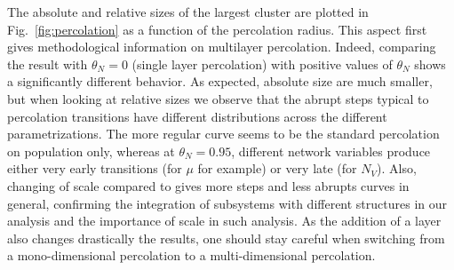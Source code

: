 \documentclass{jimis-en}
\begin{document}
The absolute and relative sizes of the largest cluster are plotted in Fig.~\ref{fig:percolation} as a function of the percolation radius. This aspect first gives methodological information on multilayer percolation. Indeed, comparing the result with $\theta_N = 0$ (single layer percolation) with positive values of $\theta_N$ shows a significantly different behavior. As expected, absolute size are much smaller, but when looking at relative sizes we observe that the abrupt steps typical to percolation transitions have different distributions across the different parametrizations. The more regular curve seems to be the standard percolation on population only, whereas at $\theta_N = 0.95$, different network variables produce either very early transitions (for $\mu$ for example) or very late (for $N_V$). Also, changing of scale compared to \cite{arcaute2016cities} gives more steps and less abrupts curves in general, confirming the integration of subsystems with different structures in our analysis and the importance of scale in such analysis. As the addition of a layer also changes drastically the results, one should stay careful when switching from a mono-dimensional percolation to a multi-dimensional percolation.



\end{document}
